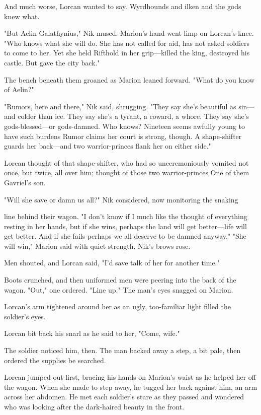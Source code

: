 And much worse, Lorcan wanted to say. Wyrdhounds and ilken and the gods knew what.

"But Aelin Galathynius," Nik mused. Marion's hand went limp on Lorcan's knee. "Who knows what she will do. She has not called for aid, has not asked soldiers to come to her. Yet she held Rifthold in her grip---killed the king, destroyed his castle. But gave the city back."

The bench beneath them groaned as Marion leaned forward. "What do you know of Aelin?"

"Rumors, here and there," Nik said, shrugging. "They say she's beautiful as sin---and colder than ice. They say she's a tyrant, a coward, a whore. They say she's gods-blessed---or gods-damned. Who knows? Nineteen seems awfully young to have such burdens  Rumor claims her court is strong, though. A shape-shifter guards her back---and two warrior-princes flank her on either side."

Lorcan thought of that shape-shifter, who had so unceremoniously vomited not once, but twice, all over him; thought of those two warrior-princes
 One of them Gavriel's son.

"Will she save or damn us all?" Nik considered, now monitoring the snaking

line behind their wagon. "I don't know if I much like the thought of everything resting in her hands, but  if she wins, perhaps the land will get better---life will get better. And if she fails 
perhaps we all deserve to be damned anyway." "She will win," Marion said with quiet strength. Nik's brows rose.

Men shouted, and Lorcan said, "I'd save talk of her for another time."

Boots crunched, and then uniformed men were peering into the back of the wagon. "Out," one ordered. "Line up." The man's eyes snagged on Marion.

Lorcan's arm tightened around her as an ugly, too-familiar light filled the soldier's eyes.

Lorcan bit back his snarl as he said to her, "Come, wife."

The soldier noticed him, then. The man backed away a step, a bit pale, then ordered the supplies be searched.

Lorcan jumped out first, bracing his hands on Marion's waist as he helped her off the wagon. When she made to step away, he tugged her back against him, an arm across her abdomen. He met each soldier's stare as they passed and wondered who was looking after the dark-haired beauty in the front.

